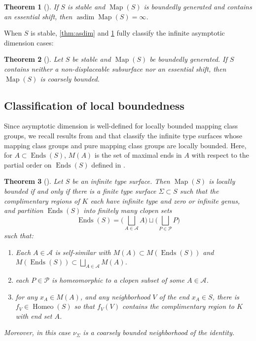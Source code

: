 \documentclass[twoside]{amsart}
\theoremstyle{plain}
\newtheorem{theorem}{Theorem}[section]
\theoremstyle{break}
\theoremstyle{definition}
\theoremstyle{remark}
\DeclareMathOperator{\Map}{Map}
\DeclareMathOperator{\Homeo}{Homeo}
\DeclareMathOperator{\Ends}{Ends}
\DeclareMathOperator{\asdim}{asdim}
\begin{document}
\begin{theorem}[{\cite[Thm.~1.1]{shift}}]\label{thm:shift}
  If $S$ is stable and $\Map(S)$ is boundedly generated and 
  contains an essential shift, then $\asdim \Map(S) = \infty$.
\end{theorem}

When $S$ is stable, \cref{thm:asdim} and
\cref{thm:shift} fully classify the infinite asymptotic
dimension cases:

\begin{theorem}[{\cite[Thm.~1.6]{shift}}]\label{thm:class}
  Let $S$ be stable and $\Map(S)$ be boundedly generated. If
  $S$ contains neither a non-displaceable subsurface nor an
  essential shift, then $\Map(S)$ is coarsely bounded.
\end{theorem}

\subsection{Classification of local boundedness}\label{sec:class_mapS}
Since asymptotic dimension is well-defined 
for locally bounded mapping class 
groups, we recall results from \cite{mannrafi} and \cite{hill} that  classify the infinite type surfaces whose mapping class groups and pure mapping class groups are locally bounded. Here, for $A\subset\Ends(S)$, $M(A)$ is the set of maximal ends in $A$ with respect to the partial order on $\Ends(S)$ defined in \cite{mannrafi}. 

\begin{theorem}[{\cite[Thm. ~1.4]{mannrafi}}]
    Let $S$ be an infinite type surface. Then $\Map(S)$ is locally
    bounded if and only if there is a finite type surface
    $\Sigma\subset S$ such that the complimentary regions of $K$
    each have infinite type and zero or infinite genus, and
    partition $\Ends(S)$ into finitely many clopen sets
   \[ 
    \Ends(S)=\Big(\bigsqcup_{A\in\mathcal{A}}A\Big)\sqcup\Big(\bigsqcup_{P\in\mathcal{P}}P\Big)
  \] 
    such that:
    \begin{enumerate}
        \item Each $A\in\mathcal{A}$ is self-similar with
          $M(A)\subset M(\Ends(S))$ and
          $M(\Ends(S))\subset\bigsqcup_{A\in\mathcal{A}}M(A)$. \item
          each $P\in\mathcal{P}$ is homeomorphic to a clopen subset 
        of some $A\in\mathcal{A}$.
        
        \item for any $x_A \in M(A)$, and any neighborhood $V$ of
          the end $x_A \in S$, there is $f_V \in \Homeo(S)$ so that
          $f_V(V)$ contains the complimentary region to $K$ with end
        set $A$.
    \end{enumerate}
    Moreover, in this case $\nu_\Sigma$ is a coarsely bounded
    neighborhood of the identity.
\end{theorem}
\end{document}

